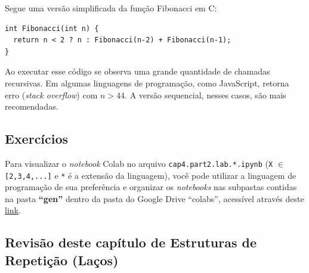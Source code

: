 \documentclass[12pt,a4paper]{article}
\begin{document}
    Segue uma versão simplificada da função Fibonacci em C:

\begin{verbatim}
int Fibonacci(int n) {
  return n < 2 ? n : Fibonacci(n-2) + Fibonacci(n-1);
}
\end{verbatim}

    Ao executar esse código se observa uma grande quantidade de chamadas
recursivas. Em algumas linguagens de programação, como JavaScript,
retorna erro (\emph{stack overflow}) com \(n>44\). A versão sequencial,
nesses casos, são mais recomendadas.

    \hypertarget{exercuxedcios}{%
\subsection{Exercícios}\label{exercuxedcios}}

    Para visualizar o \emph{notebook} Colab no arquivo
\texttt{cap4.part2.lab.*.ipynb} (\texttt{X} \(\in\)
\texttt{{[}2,3,4,...{]}} e \texttt{*} é a extensão da linguagem), você
pode utilizar a linguagem de programação de sua preferência e organizar
os \emph{notebooks} nas subpastas contidas na pasta \textbf{``gen''}
dentro da pasta do Google Drive ``colabs'', acessível através deste
\href{https://drive.google.com/drive/folders/1YlFwv8XYN7PYYf-HwDMlkxzbmXzJw9cM?usp=sharing}{link}.

    \hypertarget{revisuxe3o-deste-capuxedtulo-de-estruturas-de-repetiuxe7uxe3o-lauxe7os}{%
\subsection{Revisão deste capítulo de Estruturas de Repetição
(Laços)}\label{revisuxe3o-deste-capuxedtulo-de-estruturas-de-repetiuxe7uxe3o-lauxe7os}}
\end{document}
